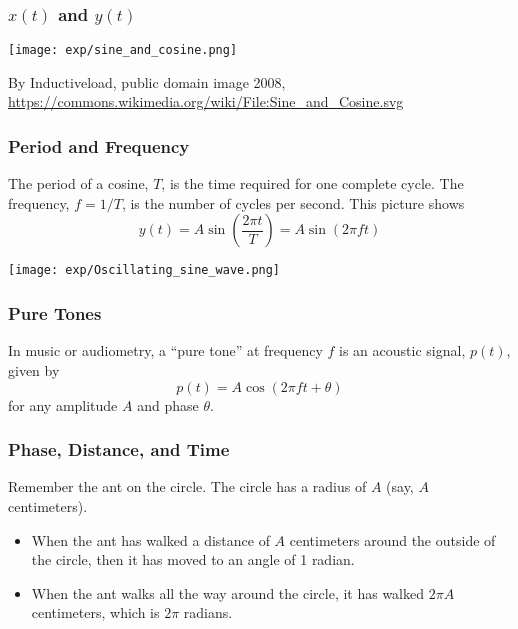 \documentclass{beamer}
\begin{document}

\begin{frame}
  \frametitle{$x(t)$ and $y(t)$}

  \centerline{\texttt{[image: exp/sine\_and\_cosine.png]}}
  \begin{tiny}
    By Inductiveload, public domain image 2008,
    \url{https://commons.wikimedia.org/wiki/File:Sine_and_Cosine.svg}
  \end{tiny}
\end{frame}

\begin{frame}
  \frametitle{Period and Frequency}

  The period of a cosine, $T$, is the time required for one complete
  cycle.  The frequency, $f=1/T$, is the number of cycles per second.
  This picture shows
  \[
  y(t)  = A\sin\left(\frac{2\pi t}{T}\right) = A\sin\left(2\pi ft\right)
  \]
  \centerline{\texttt{[image: exp/Oscillating\_sine\_wave.png]}}
\end{frame}  

\begin{frame}
  \frametitle{Pure Tones}
  
  In music or audiometry, a ``pure tone'' at frequency $f$ is an
  acoustic signal, $p(t)$, given by
  \[
  p(t) = A\cos\left(2\pi ft+\theta\right)
  \]
  for any amplitude $A$ and phase $\theta$.
  \vspace*{3mm}
  
  \centerline{}
\end{frame}
  
\begin{frame}
  \frametitle{Phase, Distance, and Time}
  
  Remember the ant on the circle.  The circle has a radius of $A$ (say, $A$ centimeters).
  \begin{itemize}
  \item When the ant has walked a distance of $A$ centimeters around
    the outside of the circle, then it has moved to an angle of 1 radian.
  \item When the ant walks all the way around the circle, it has
    walked $2\pi A$ centimeters, which is $2\pi$ radians.
  \end{itemize}
\end{frame}
\end{document}
